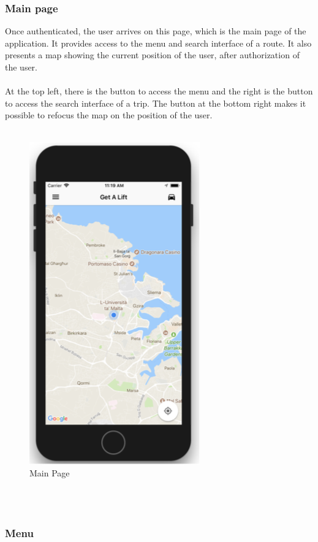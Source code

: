 \subsubsection{Main page}

Once authenticated, the user arrives on this page, which is the main page of the application. It provides access to the menu and search interface of a route. It also presents a map showing the current position of the user, after authorization of the user.
\\\\
At the top left, there is the button to access the menu and the right is the button to access the search interface of a trip. The button at the bottom right makes it possible to refocus the map on the position of the user.
\\\\
\begin{figure}[h!]
\begin{center}
\includegraphics[scale = 0.3]{diagrams/MainPage.png} 
\end{center}
\caption{Main Page}
\end{figure}
\\\\

\subsubsection{Menu}

